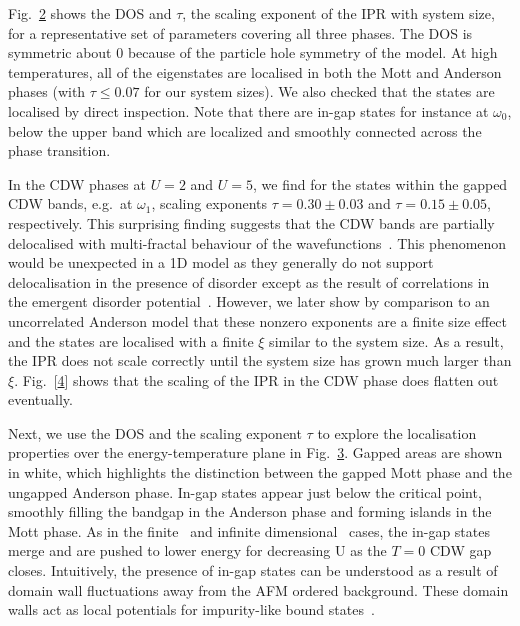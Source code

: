 Fig.~\protect\hyperlink{fig:indiv_IPR}{2} shows the DOS and \(\tau\), the scaling exponent of the IPR with system size, for a representative set of parameters covering all three phases. The DOS is symmetric about \(0\) because of the particle hole symmetry of the model. At high temperatures, all of the eigenstates are localised in both the Mott and Anderson phases (with \(\tau \leq 0.07\) for our system sizes). We also checked that the states are localised by direct inspection. Note that there are in-gap states for instance at \(\omega_0\), below the upper band which are localized and smoothly connected across the phase transition.

In the CDW phases at \(U=2\) and \(U=5\), we find for the states within the gapped CDW bands, e.g.~at \(\omega_1\), scaling exponents \(\tau = 0.30\pm0.03\) and \(\tau = 0.15\pm0.05\), respectively. This surprising finding suggests that the CDW bands are partially delocalised with multi-fractal behaviour of the wavefunctions~\autocite{eversAndersonTransitions2008a}. This phenomenon would be unexpected in a 1D model as they generally do not support delocalisation in the presence of disorder except as the result of correlations in the emergent disorder potential~\autocite{croyAndersonLocalization1D2011,goldshteinPurePointSpectrum1977}. However, we later show by comparison to an uncorrelated Anderson model that these nonzero exponents are a finite size effect and the states are localised with a finite \(\xi\) similar to the system size. As a result, the IPR does not scale correctly until the system size has grown much larger than \(\xi\). Fig.~{[}\protect\hyperlink{fig:indiv_IPR_disorder}{4}{]} shows that the scaling of the IPR in the CDW phase does flatten out eventually.

Next, we use the DOS and the scaling exponent \(\tau\) to explore the localisation properties over the energy-temperature plane in Fig.~\protect\hyperlink{fig:band_opening}{3}. Gapped areas are shown in white, which highlights the distinction between the gapped Mott phase and the ungapped Anderson phase. In-gap states appear just below the critical point, smoothly filling the bandgap in the Anderson phase and forming islands in the Mott phase. As in the finite~\autocite{zondaGaplessRegimeCharge2019} and infinite dimensional~\autocite{hassanSpectralPropertiesChargedensitywave2007} cases, the in-gap states merge and are pushed to lower energy for decreasing U as the \(T=0\) CDW gap closes. Intuitively, the presence of in-gap states can be understood as a result of domain wall fluctuations away from the AFM ordered background. These domain walls act as local potentials for impurity-like bound states~\autocite{zondaGaplessRegimeCharge2019}.


